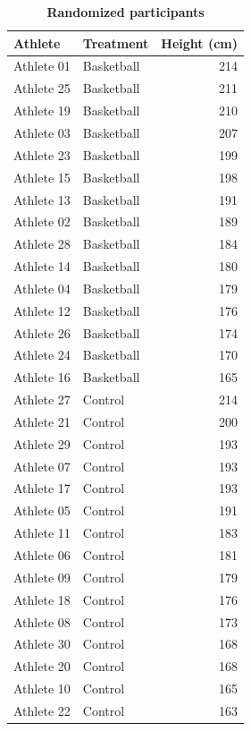 \documentclass[
]{book}
\begin{document}
\begin{table}

\caption{\label{tab:randomized-basketball-data}\textbf{Randomized participants}}
\centering
\begin{tabular}[t]{llr}
\toprule
Athlete & Treatment & Height (cm)\\
\midrule
Athlete 01 & Basketball & 214\\
Athlete 25 & Basketball & 211\\
Athlete 19 & Basketball & 210\\
Athlete 03 & Basketball & 207\\
Athlete 23 & Basketball & 199\\
\addlinespace
Athlete 15 & Basketball & 198\\
Athlete 13 & Basketball & 191\\
Athlete 02 & Basketball & 189\\
Athlete 28 & Basketball & 184\\
Athlete 14 & Basketball & 180\\
\addlinespace
Athlete 04 & Basketball & 179\\
Athlete 12 & Basketball & 176\\
Athlete 26 & Basketball & 174\\
Athlete 24 & Basketball & 170\\
Athlete 16 & Basketball & 165\\
\addlinespace
Athlete 27 & Control & 214\\
Athlete 21 & Control & 200\\
Athlete 29 & Control & 193\\
Athlete 07 & Control & 193\\
Athlete 17 & Control & 193\\
\addlinespace
Athlete 05 & Control & 191\\
Athlete 11 & Control & 183\\
Athlete 06 & Control & 181\\
Athlete 09 & Control & 179\\
Athlete 18 & Control & 176\\
\addlinespace
Athlete 08 & Control & 173\\
Athlete 30 & Control & 168\\
Athlete 20 & Control & 168\\
Athlete 10 & Control & 165\\
Athlete 22 & Control & 163\\
\bottomrule
\end{tabular}
\end{table}
\end{document}
